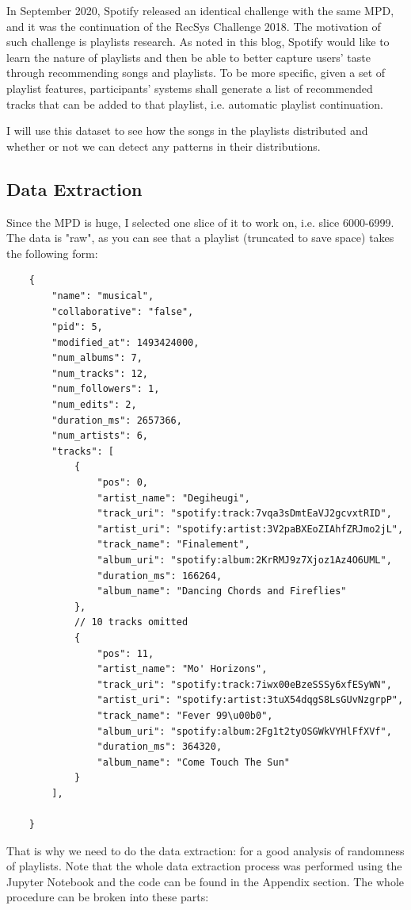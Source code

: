 \documentclass[12pt]{article}
\theoremstyle{plain}
\theoremstyle{definition}
\theoremstyle{remark}
\begin{document}
In September 2020, Spotify released an identical challenge with the same MPD, and it was the continuation of the RecSys Challenge 2018. The motivation of such challenge is playlists research. As noted in this blog\cite{2.1}, Spotify would like to learn the nature of playlists and then be able to better capture users' taste through recommending songs and playlists. To be more specific, given a set of playlist features, participants' systems shall generate a list of recommended tracks that can be added to that playlist, i.e. automatic playlist continuation.

I will use this dataset to see how the songs in the playlists distributed and whether or not we can detect any patterns in their distributions.

\subsection{Data Extraction}
Since the MPD is huge, I selected one slice of it to work on, i.e. slice 6000-6999. The data is "raw", as you can see that a playlist (truncated to save space) takes the following form\cite{2.1}: 
\begin{verbatim}
    {
        "name": "musical",
        "collaborative": "false",
        "pid": 5,
        "modified_at": 1493424000,
        "num_albums": 7,
        "num_tracks": 12,
        "num_followers": 1,
        "num_edits": 2,
        "duration_ms": 2657366,
        "num_artists": 6,
        "tracks": [
            {
                "pos": 0,
                "artist_name": "Degiheugi",
                "track_uri": "spotify:track:7vqa3sDmtEaVJ2gcvxtRID",
                "artist_uri": "spotify:artist:3V2paBXEoZIAhfZRJmo2jL",
                "track_name": "Finalement",
                "album_uri": "spotify:album:2KrRMJ9z7Xjoz1Az4O6UML",
                "duration_ms": 166264,
                "album_name": "Dancing Chords and Fireflies"
            },
            // 10 tracks omitted
            {
                "pos": 11,
                "artist_name": "Mo' Horizons",
                "track_uri": "spotify:track:7iwx00eBzeSSSy6xfESyWN",
                "artist_uri": "spotify:artist:3tuX54dqgS8LsGUvNzgrpP",
                "track_name": "Fever 99\u00b0",
                "album_uri": "spotify:album:2Fg1t2tyOSGWkVYHlFfXVf",
                "duration_ms": 364320,
                "album_name": "Come Touch The Sun"
            }
        ],

    }
\end{verbatim}
That is why we need to do the data extraction: for a good analysis of randomness of playlists. Note that the whole data extraction process was performed using the Jupyter Notebook and the code can be found in the Appendix section. The whole procedure can be broken into these parts: 
\end{document}

